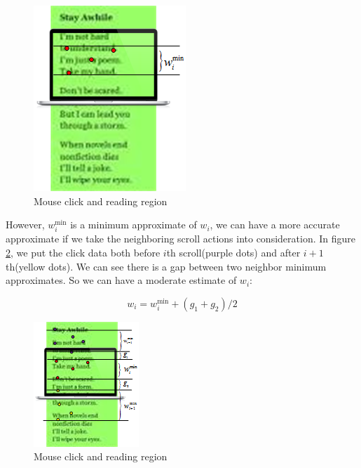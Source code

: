\documentclass{sigchi}
\begin{document}
\begin{figure}[!h]
\centering
\includegraphics[width=0.7\columnwidth]{pictures/single_click}
\caption{Mouse click and reading region}
\label{fig:single_click}
\end{figure}

However, $w_i^{\min }$ is a minimum approximate of $w_i$, we can have a more accurate approximate if we take the neighboring 
scroll actions into consideration. In figure \ref{fig:neighbor_scroll}, we put the click data both before $i$th scroll(purple dots) and after $i+1$th(yellow dots).
We can see there is a gap between two neighbor minimum approximates. So we can have a moderate estimate of $w_i$:


\begin{equation} \label{eq:4}
{w_i} = w_i^{\min } + ({g_1} + {g_2})/2
\end{equation}
 

\begin{figure}[!h]
\centering
\includegraphics[width=0.9\columnwidth]{pictures/neighbor-scroll}
\caption{Mouse click and reading region}
\label{fig:neighbor_scroll}
\end{figure}




\end{document}
